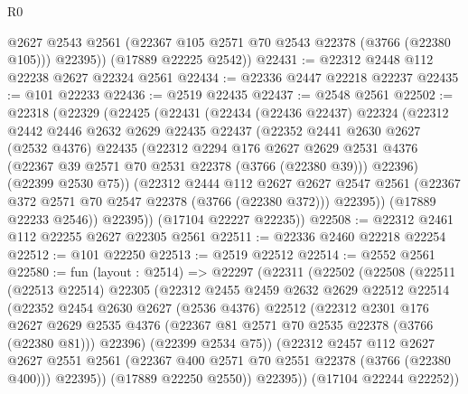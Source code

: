 \begin{lexlean}{R0}
\begin{coremodule}
          @2627
          @2543
          @2561
          (@22367 @105 @2571 @70 @2543 @22378 (@3766 (@22380 @105)))
          @22395))
      (@17889 @22225 @2542))
@22431 := @22312 @2448 @112 @22238 @2627 @22324 @2561
@22434 := @22336 @2447 @22218 @22237
@22435 := @101 @22233
@22436 := @2519 @22435
@22437 := @2548 @2561
@22502 := @22318
    (@22329
      (@22425
        (@22431
          (@22434
            (@22436 @22437)
            @22324
            (@22312
              @2442
              @2446
              @2632
              @2629
              @22435
              @22437
              (@22352
                @2441
                @2630
                @2627
                (@2532 @4376)
                @22435
                (@22312
                  @2294
                  @176
                  @2627
                  @2629
                  @2531
                  @4376
                  (@22367 @39 @2571 @70 @2531 @22378 (@3766 (@22380 @39)))
                  @22396)
                (@22399 @2530 @75))
              (@22312
                @2444
                @112
                @2627
                @2627
                @2547
                @2561
                (@22367 @372 @2571 @70 @2547 @22378 (@3766 (@22380 @372)))
                @22395))
            (@17889 @22233 @2546))
          @22395))
      (@17104 @22227 @22235))
@22508 := @22312 @2461 @112 @22255 @2627 @22305 @2561
@22511 := @22336 @2460 @22218 @22254
@22512 := @101 @22250
@22513 := @2519 @22512
@22514 := @2552 @2561
@22580 := fun (layout : @2514) =>
  @22297
    (@22311
      (@22502
        (@22508
          (@22511
            (@22513 @22514)
            @22305
            (@22312
              @2455
              @2459
              @2632
              @2629
              @22512
              @22514
              (@22352
                @2454
                @2630
                @2627
                (@2536 @4376)
                @22512
                (@22312
                  @2301
                  @176
                  @2627
                  @2629
                  @2535
                  @4376
                  (@22367 @81 @2571 @70 @2535 @22378 (@3766 (@22380 @81)))
                  @22396)
                (@22399 @2534 @75))
              (@22312
                @2457
                @112
                @2627
                @2627
                @2551
                @2561
                (@22367 @400 @2571 @70 @2551 @22378 (@3766 (@22380 @400)))
                @22395))
            (@17889 @22250 @2550))
          @22395))
      (@17104 @22244 @22252))

\end{coremodule}
\end{lexlean}
